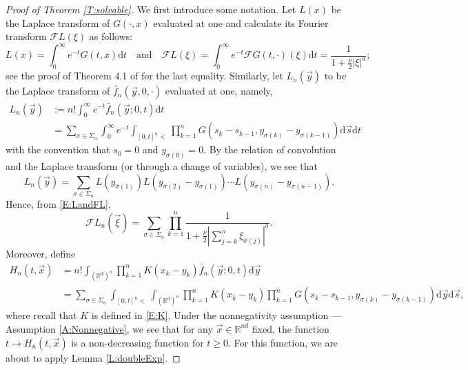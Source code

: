 \documentclass[a4paper,11pt]{article}
\numberwithin{equation}{section}
\numberwithin{equation}{section}
\theoremstyle{plain}
\theoremstyle{definition}
\newcommand{\ud}{\ensuremath{\mathrm{d} }}
\newcommand{\R}{\mathbb{R}}
\begin{document}
\begin{proof}[Proof of Theorem \ref{T:solvable}]
  We first introduce some notation. Let $L(x)$ be the Laplace transform of $G(\cdot,x)$ evaluated at
  one and calculate its Fourier transform $\mathcal{F}L(\xi)$ as follows:
  \begin{equation}
    \label{E:LandFL}
    L(x)              = \int_0^\infty e^{-t}G(t,x) \ud t \quad \text{and} \quad
    \mathcal{F}L(\xi) = \int_0^\infty e^{-t}\mathcal{F}G(t,\cdot)(\xi) \ud t
                      = \dfrac{1}{1 + \frac{\nu}{2}|\xi|^a};
  \end{equation}
  see the proof of Theorem 4.1 of \cite{CHN19} for the last equality.  Similarly, let $L_n(\vec{y})$
  to be the Laplace transform of $\widetilde{f_n}(\vec{y},0,\cdot)$ evaluated at one, namely,
  \begin{align*}
    L_n(\vec{y}) & := n! \int_0^\infty e^{-t}\widetilde{f_n}(\vec{y};0,t) \ud t \\
                 & = \sum_{\sigma \in \Sigma_n} \int_0^\infty e^{-t} \int_{[0,t]^n<} \prod_{k=1}^n G(s_k - s_{k-1}, y_{\sigma(k)}-y_{\sigma(k-1)}) \ud \vec{s} \ud t
  \end{align*}
  with the convention that $s_0 = 0$ and $y_{\sigma(0)} = 0$.  By the relation of convolution and
  the Laplace transform (or through a change of variables), we see that
  \begin{equation}
      L_n(\vec{y}) = \sum_{\sigma \in \Sigma_n} L\left(y_{\sigma(1)}\right) L\left(y_{\sigma(2)}-y_{\sigma(1)}\right) \cdots L\left(y_{\sigma(n)}-y_{\sigma(n-1)}\right).
  \end{equation}
  Hence, from \eqref{E:LandFL},
  \begin{equation} \label{E:FLfn}
    \mathcal{F}L_n(\vec{\xi}) = \sum_{\sigma \in \Sigma_n} \prod_{k=1}^{n} \dfrac{1}{1+ \frac{\nu}{2}\left|\sum_{j=k}^n \xi_{\sigma(j)} \right|^a}.
  \end{equation}
  Moreover, define
  \begin{align}
    H_n(t, \vec{x})
    & = n! \int_{(\R^d)^n} \prod_{k=1}^n K(x_k - y_k) \widetilde{f_n}(\vec{y};0,t) \ud \vec{y} \nonumber \\
    & = \sum_{\sigma \in \Sigma_n} \int_{[0,t]^n <} \int_{(\R^d)^n} \prod_{k=1}^n K(x_k-y_k)   \prod_{k=1}^n G(s_k - s_{k-1}, y_{\sigma(k)} - y_{\sigma(k-1)}) \ud \vec{y} \ud \vec{s},
    \label{E:H}
  \end{align}
  where recall that $K$ is defined in \eqref{E:K}. Under the nonnegativity assumption --- Assumption
  \ref{A:Nonnegative}, we see that for any $\vec{x} \in\R^{nd}$ fixed, the function $t\to
  H_n\left(t,\vec{x} \right)$ is a non-decreasing function for $t\ge 0$. For this function, we are
  about to apply Lemma \ref{L:doubleExp}.



\end{proof}
\end{document}
